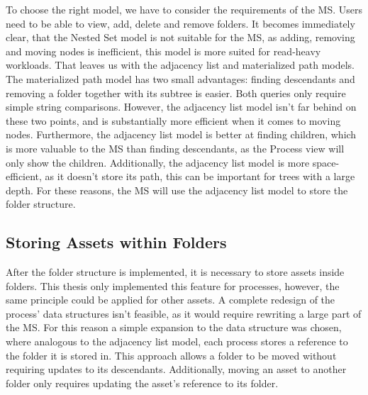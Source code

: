 To choose the right model, we have to consider the requirements of the MS.
Users need to be able to view, add, delete and remove folders.
It becomes immediately clear, that the Nested Set model is not suitable for the MS, as
adding, removing and moving nodes is inefficient, this model is more suited for read-heavy
workloads.
That leaves us with the adjacency list and materialized path models.
%
The materialized path model has two small advantages: finding descendants and removing a
folder together with its subtree is easier.
Both queries only require simple string comparisons.
%
%
However, the adjacency list model isn't far behind on these two points, and is
substantially more efficient when it comes to moving nodes.
Furthermore, the adjacency list model is better at finding children, 
which is more valuable to the MS than finding descendants,
as the Process view will only show the children.
Additionally, the adjacency list model is more space-efficient, as it doesn't store its
path, this can be important for trees with a large depth.
For these reasons, the MS will use the adjacency list model to store the folder structure.

\subsection{Storing Assets within Folders}

After the folder structure is implemented, it is necessary to store assets inside
folders.
This thesis only implemented this feature for processes, however, the same principle could
be applied for other assets.
A complete redesign of the process' data structures isn't feasible, as it would require
rewriting a large part of the MS.
For this reason a simple expansion to the data structure was chosen, where analogous to
the adjacency list model, each process stores a reference to the folder it is stored in.
This approach allows a folder to be moved without requiring updates to its descendants.
Additionally, moving an asset to another folder only requires updating the asset's
reference to its folder.


